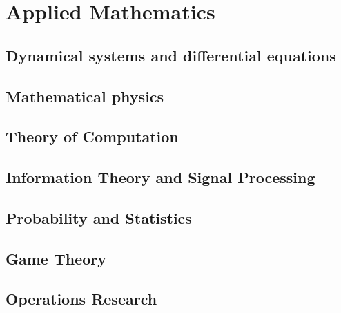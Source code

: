 \documentclass[a4paper]{book}
\begin{document}
\section{Applied Mathematics}
\subsection{Dynamical systems and differential equations}

\subsection{Mathematical physics}

\subsection{Theory of Computation}

\subsection{Information Theory and Signal Processing}

\subsection{Probability and Statistics}

\subsection{Game Theory}

\subsection{Operations Research}
\end{document}
